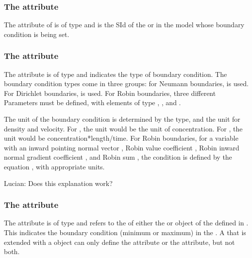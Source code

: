 \subsubsection{The  attribute}
The  attribute of \BoundaryCondition is of type  and is the SId of the \Species or \Parameter in the model whose boundary condition is being set.

\subsubsection{The  attribute}
The  attribute is of type  and indicates the type of boundary condition. The boundary condition types come in three groups: for Neumann boundaries,  is used.  For Dirichlet boundaries,  is used.  For Robin boundaries, three different Parameters must be defined, with \BoundaryCondition elements of type , , and .

The unit of the boundary condition is determined by the type, and the unit for density and velocity.  For , the unit would be the unit of concentration.  For , the unit would be concentration*length/time.  For Robin boundaries, for a variable  with an inward pointing normal vector , Robin value coefficient , Robin inward normal gradient coefficient , and Robin sum , the condition is defined by the equation , with appropriate units.

{\color{red} Lucian: \notice Does this explanation work?}

\subsubsection{The  attribute}
The  attribute is of type  and refers to the  of either the  or  object of the \CoordinateComponent defined in \Geometry. This  indicates the boundary condition (minimum or maximum) in the \CoordinateComponent. A \Parameter that is extended with a \BoundaryCondition object can only define the  attribute or the  attribute, but not both.

